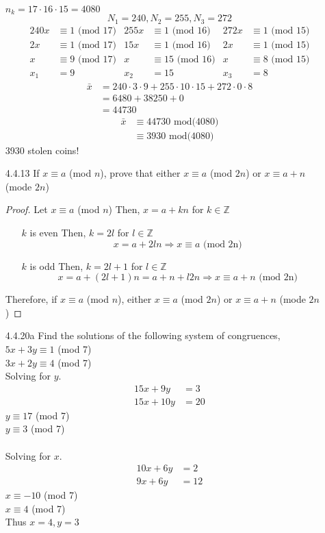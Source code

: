 \documentclass[12pt]{article}
\newcommand{\Z}{\mathds{Z}}
\begin{document}
\begin{enumerate}
		$ n_k = 17\cdot16\cdot15=4080 $
	\[	N_1 = 240,
	N_2 = 255,
	N_3 = 272\]
	\begin{align*}
	240x&\equiv 1 \text{ (mod 17)} & 255x&\equiv 1 \text{ (mod 16)} & 272x&\equiv 1 \text{ (mod 15)}\\
	2x&\equiv 1 \text{ (mod 17)} & 15x&\equiv 1 \text{ (mod 16)} & 2x&\equiv 1 \text{ (mod 15)}\\
	x&\equiv 9 \text{ (mod 17)} & x&\equiv 15 \text{ (mod 16)} & x&\equiv 8\text{ (mod 15)}\\
	x_1 &= 9 & x_2 &= 15 & x_3 &= 8
	\end{align*}
	\begin{align*}
	\bar{x} &= 240\cdot 3\cdot 9 + 255\cdot 10\cdot 15 + 272\cdot 0 \cdot 8\\
	&= 6480 + 38250 + 0\\
	&= 44730
	\end{align*}
	\begin{align*}
	\bar{x} &\equiv 44730 \text{ mod(4080)}\\
	&\equiv 3930 \text { mod(4080)}
	\end{align*}
	3930 stolen coins!
	\item[4.4.13] If $ x\equiv a$ (mod $ n $), prove that either $ x \equiv a$ (mod $ 2n $) or $ x \equiv a+n $ (mode $ 2n $)
		\begin{proof}
			Let $ x \equiv a $ (mod $ n $) Then, $ x=a+kn $ for $ k\in\Z $\
			\begin{enumerate}
				\item [$ k $ is even] Then, $ k=2l $ for $ l\in\Z $ 
					\[x=a+2ln \Rightarrow x\equiv a \text{ (mod 2n)}\]
				\item [$ k $ is odd] Then, $ k=2l +1 $ for $ l\in\Z $ 
				\[x=a+(2l+1)n = a + n + l2n \Rightarrow x\equiv a + n \text{ (mod 2n)}\]
			\end{enumerate}
		Therefore, if $ x\equiv a$ (mod $ n $), either $ x \equiv a$ (mod $ 2n $) or $ x \equiv a+n $ (mode $ 2n $)
		\end{proof}
	\item[4.4.20a] Find the solutions of the following system of congruences, \\ $ 5x+3y \equiv 1 $ (mod 7) \\ $ 3x+2y \equiv 4 $ (mod 7)\\
	Solving for $ y $.
	\begin{align*}
		15x+9y &= 3 \\
		15x+10y &= 20 
	\end{align*}
	$ y \equiv 17 $ (mod 7) \\
	$ y \equiv 3 $ (mod 7)\\
	\\
	Solving for $ x $.
		\begin{align*}
	10x+6y &= 2 \\
	9x+6y &= 12 
	\end{align*}
	$ x \equiv -10 $ (mod 7) \\
	$ x \equiv 4 $ (mod 7)\\
	Thus $ x = 4 , y = 3 $
\end{enumerate}
\end{document}
